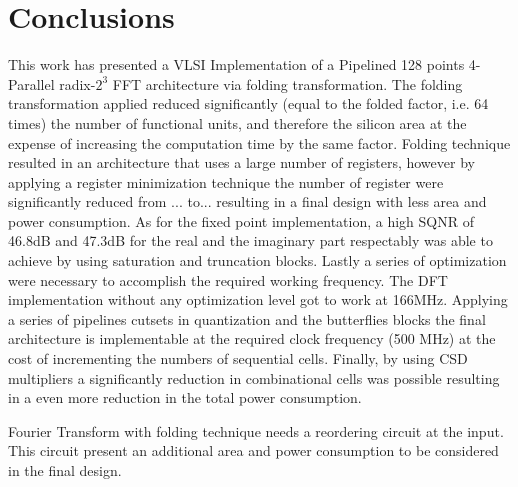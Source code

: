 \documentclass[journal,comsoc]{IEEEtran}
\begin{document}

%


	







 
\section{Conclusions} \label{sec:conclusions}
This work has presented a VLSI Implementation of a Pipelined 128 points 4-Parallel radix-$2^3$ FFT architecture via folding transformation.
The folding transformation applied reduced significantly (equal to the folded factor, i.e. 64 times) the number of functional units, and therefore the silicon area at the expense of increasing the computation time by the same factor.
Folding technique resulted in an architecture that uses a large number of registers, however by applying a register minimization technique the number of register were significantly reduced from ... to...  resulting in a final design with less area and power consumption. As for the fixed point implementation, a high SQNR of 46.8dB and 47.3dB for the real and the imaginary part respectably was able to achieve by using saturation and truncation blocks. 
Lastly a series of optimization were necessary to accomplish the required working frequency. The DFT implementation without any optimization level got to work at 166MHz. Applying a series of pipelines cutsets in quantization and the butterflies blocks the final architecture is implementable at the required clock frequency (500 MHz) at the cost of incrementing the numbers of sequential cells. Finally, by using CSD multipliers a significantly reduction in combinational cells was possible resulting in a even more reduction in the total power consumption.




Fourier Transform with folding technique needs a reordering circuit at the input. This circuit present an additional area and power consumption to be considered in the final design. 
\end{document}
